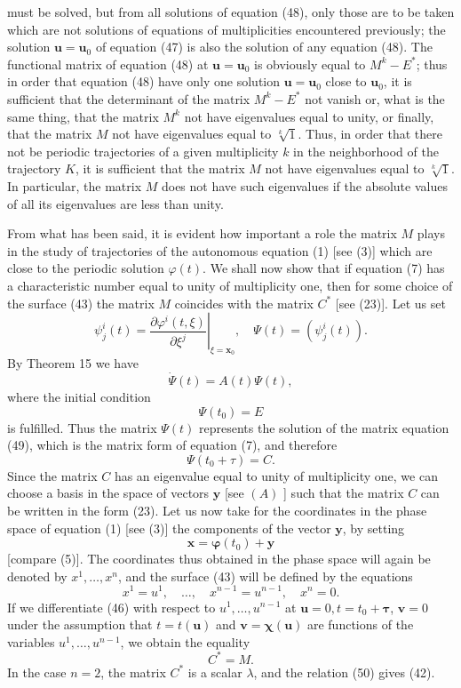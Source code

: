 \documentclass[10pt,a5paper]{book}
\theoremstyle{plain}
\theoremstyle{definition}
\theoremstyle{remark}
\begin{document}
must be solved, but from all solutions of equation (48), only those are to be taken which are not solutions of equations of multiplicities encountered previously; the solution $\mathbf{u}=\mathbf{u}_{0}$ of equation (47) is also the solution of any equation (48). The functional matrix of equation (48) at $\mathbf{u}=\mathbf{u}_{0}$ is obviously equal to $M^{k}-E^{*}$; thus in order that equation (48) have only one solution $\mathbf{u}=\mathbf{u}_{0}$ close to $\mathbf{u}_{0}$, it is sufficient that the determinant of the matrix $M^{k}-E^{*}$ not vanish or, what is the same thing, that the matrix $M^{k}$ not have eigenvalues equal to unity, or finally, that the matrix $M$ not have eigenvalues equal to $\sqrt[k]{1}$. Thus, in order that there not be periodic trajectories of a given multiplicity $k$ in the neighborhood of the trajectory $K$, it is sufficient that the matrix $M$ not have eigenvalues equal to $\sqrt[k]{1}$. In particular, the matrix $M$ does not have such eigenvalues if the absolute values of all its eigenvalues are less than unity.

From what has been said, it is evident how important a role the matrix $M$ plays in the study of trajectories of the autonomous equation (1) [see (3)] which are close to the periodic solution $\varphi(t)$. We shall now show that if equation (7) has a characteristic number equal to unity of multiplicity one, then for some choice of the surface (43) the matrix $M$ coincides with the matrix $C^{*}$ [see (23)]. Let us set
\[
\psi_{j}^{i}(t)=\left.\frac{\partial \varphi^{i}(t, \xi)}{\partial \xi^{j}}\right|_{\xi=\mathbf{x}_{0}}, \quad \Psi(t)=\left(\psi_{j}^{i}(t)\right) .
\]
By Theorem 15 we have
\begin{equation*}
\dot{\Psi}(t)=A(t) \Psi(t), \tag{49}
\end{equation*}
where the initial condition
\[
\Psi\left(t_{0}\right)=E
\]
is fulfilled. Thus the matrix $\Psi(t)$ represents the solution of the matrix equation (49), which is the matrix form of equation (7), and therefore
\[
\Psi\left(t_{0}+\tau\right)=C .
\]
Since the matrix $C$ has an eigenvalue equal to unity of multiplicity one, we can choose a basis in the space of vectors $\mathbf{y}$ [see $(A)$ ] such that the matrix $C$ can be written in the form (23). Let us now take for the coordinates in the phase space of equation (1) [see (3)] the components of the vector $\mathbf{y}$, by setting
\[
\mathbf{x}=\boldsymbol{\varphi}\left(t_{0}\right)+\mathbf{y}
\]
[compare (5)]. The coordinates thus obtained in the phase space will again be denoted by $x^{1}, \ldots, x^{n}$, and the surface (43) will be defined by the equations
\[
x^{1}=u^{1}, \quad \ldots, \quad x^{n-1}=u^{n-1}, \quad x^{n}=0 .
\]
If we differentiate (46) with respect to $u^{1}, \ldots, u^{n-1}$ at $\mathbf{u}=0, t=t_{0}+\boldsymbol{\tau}$, $\mathbf{v}=0$ under the assumption that $t=t(\mathbf{u})$ and $\mathbf{v}=\boldsymbol{\chi}(\mathbf{u})$ are functions of the variables $u^{1}, \ldots, u^{n-1}$, we obtain the equality
\begin{equation*}
C^{*}=M . \tag{50}
\end{equation*}
In the case $n=2$, the matrix $C^{*}$ is a scalar $\lambda$, and the relation (50) gives (42).
\end{document}

